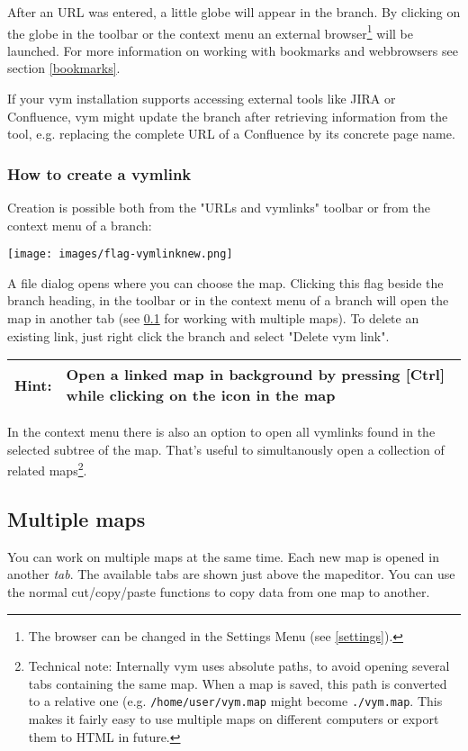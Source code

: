 \documentclass[12pt,a4paper]{article}
\newcommand{\hint}[1]{
    \begin{center} 
        \begin{tabular}{|rp{12cm}|} \hline
            {\bf Hint}:& #1\\   \hline
        \end{tabular}
            \marginpar{\Huge !} 
    \end{center} 
}
\newcommand{\vym}{{\sc vym }}
\newcommand{\key}[1]{[#1]}
\begin{document}
After an URL was entered, a little globe will appear in the branch. By
clicking on the globe in the toolbar or the context menu an external
browser\footnote{
    The browser can be changed in the Settings Menu (see \ref{settings}).}
will be launched.
For more information on working with bookmarks and webbrowsers see
section \ref{bookmarks}.

If your \vym installation supports accessing external tools like JIRA or
Confluence, \vym might update the branch after retrieving information
from the tool, e.g. replacing the complete URL of a Confluence by its
concrete page name. 
\subsubsection{How to create a vymlink}
Creation is possible both from the "URLs and vymlinks" toolbar or from
the context menu of a branch:
    \begin{center}
	\texttt{[image: images/flag-vymlinknew.png]}
    \end{center}

A file dialog opens where you can choose the map. 
Clicking this flag beside the branch heading, in the toolbar or in the
context menu of a branch will open the map in another tab (see
\ref{tabs} for working with multiple maps). To delete an existing link,
just right click the branch and select "Delete \vym link".

\hint{Open a linked map in background by pressing \key{Ctrl} while
clicking on the icon in the map}

In the context menu there is also an option to open all vymlinks found
in the selected subtree of the map. That's useful to simultanously open
a collection of related maps\footnote{
    Technical note: Internally \vym uses absolute paths, to avoid
    opening several tabs containing the same map. When a map is saved,
    this path is converted to a relative one 
    (e.g. {\tt /home/user/vym.map} might become {\tt ./vym.map}. This
    makes it fairly easy to use multiple maps on different computers or
    export them to HTML in future.}.


\subsection{Multiple maps} \label{tabs}
You can work on multiple maps at the same time. Each new map is opened
in another {\em tab}. The available tabs are shown just above the
mapeditor. You can use the normal cut/copy/paste functions to
copy data from one map to another.
\end{document}

